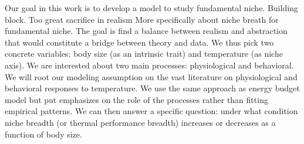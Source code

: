Our goal in this work is to develop a model to study fundamental niche. Building block. Too great sacrifice in realism
More specifically about niche breath for fundamental niche.
The goal is find a balance between realism and abstraction that would constitute a bridge between theory and data.
We thus pick two concrete variables: body size (as an intrinsic trait) and temperature (as niche axis). 
We are interested about two main processes: physiological and behavioral. %
We will root our modeling assumption on the vast literature on physiological and behavioral responses to temperature. 
We use the same approach as energy budget model but put emphasizes on the role of the processes rather than fitting empirical patterns.%
We can then answer a specific question: under what condition niche breadth (or thermal performance breadth) increases or decreases as a function of body size.



